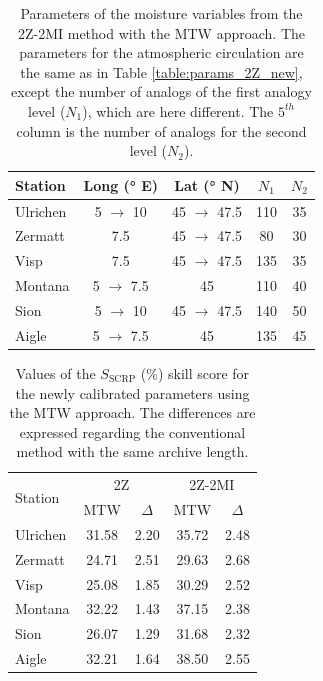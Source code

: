 \documentclass[hess, manuscript]{copernicus}
\begin{document}
\begin{table}[htb]
	\caption{Parameters of the moisture variables from the 2Z-2MI method with the MTW approach. The parameters for the atmospheric circulation are the same as in Table \ref{table:params_2Z_new}, except the number of analogs of the first analogy level ($N_{1}$), which are here different. The $5^{th}$ column is the number of analogs for the second level ($N_{2}$).}
	\begin{center}
		\begin{tabular}{l c c c c }
			\hline
			Station & Long (° E) & Lat (° N) & $N_{1}$ & $N_{2}$ \\
			\hline
			Ulrichen & 5 $\rightarrow$ 10 & 45 $\rightarrow$ 47.5 & 110 & 35 \\
			Zermatt & 7.5 & 45 $\rightarrow$ 47.5 & 80 & 30 \\
			Visp & 7.5 & 45 $\rightarrow$ 47.5 & 135 & 35 \\
			Montana & 5 $\rightarrow$ 7.5 & 45 & 110 & 40 \\
			Sion & 5 $\rightarrow$ 10 & 45 $\rightarrow$ 47.5 & 140 & 50 \\
			Aigle & 5 $\rightarrow$ 7.5 & 45 & 135 & 45 \\ 
			\hline
		\end{tabular}
	\end{center}
	\label{table:params_2Z-2MI_new}
\end{table}

\begin{table}[htb]
	\caption{Values of the $S_{\text{SCRP}}$ (\%) skill score for the newly calibrated parameters using the MTW approach. The differences are expressed regarding the conventional method with the same archive length.}
	\begin{center}
		\begin{tabular}{l c c c c}
			\hline
			\multirow{2}{*}{Station} & \multicolumn{2}{c}{2Z} & \multicolumn{ 2}{c}{2Z-2MI} \\
			& MTW & $\Delta$ & MTW & $\Delta$ \\
			\hline
			Ulrichen & 31.58 & 2.20 & 35.72 & 2.48  \\
			Zermatt & 24.71 & 2.51 & 29.63 & 2.68 \\
			Visp & 25.08 & 1.85 & 30.29 & 2.52 \\
			Montana & 32.22 & 1.43 & 37.15 & 2.38 \\
			Sion & 26.07 & 1.29 & 31.68 & 2.32 \\
			Aigle & 32.21 & 1.64 & 38.50 & 2.55 \\
			\hline
		\end{tabular}
	\end{center}
	\label{table:CRPSS_recalibration}
\end{table}
\end{document}
